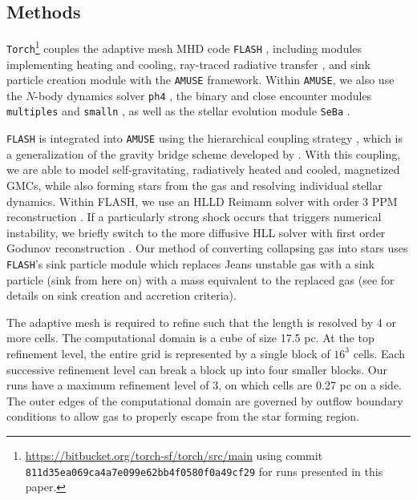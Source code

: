\documentclass[twoside]{drexel-thesis}
\begin{document}
\begin{thesis}
\section{Methods} \label{sec:p1-methods}

\texttt{Torch}\footnote{\url{https://bitbucket.org/torch-sf/torch/src/main} using commit \texttt{ 811d35ea069ca4a7e099e62bb4f0580f0a49cf29} for runs presented in this paper.} \citep{wall_collisional_2019} couples the adaptive mesh MHD code \texttt{FLASH} \citep{fryxell_flash_2000}, including modules implementing heating and cooling, ray-traced radiative transfer \citep{baczynski_fervent_2015}, and sink particle creation module \citep{federrath_modeling_2010} with the \texttt{AMUSE} framework. 
Within \texttt{AMUSE}, we also use the $N$-body dynamics solver \texttt{ph4} \citep{mcmillan_simulations_2012}, the binary and close encounter modules \texttt{multiples} \citep{portegies_zwart_astrophysical_2018} and \texttt{smalln} \citep{hut_building_1995,mcmillan_binary--single-star_1996}, as well as the stellar evolution module \texttt{SeBa} \citep{portegies_zwart_population_1996}.

\texttt{FLASH} is integrated into \texttt{AMUSE} using the hierarchical coupling strategy \citep{portegies_zwart_non-intrusive_2020}, which is a generalization of the gravity bridge scheme developed by \citet{fujii_bridge_2007}.
With this coupling, we are able to model self-gravitating, radiatively heated and cooled, magnetized GMCs, while also forming stars from the gas and resolving individual stellar dynamics. Within FLASH, we use an HLLD Reimann solver \citep{miyoshi_multi-state_2005} with order 3 PPM reconstruction \citep{colella_piecewise_1984}. If a particularly strong shock occurs that triggers numerical instability, we briefly switch to the more diffusive HLL solver \citep{einfeldt_godunov-type_1991} with first order Godunov reconstruction \citep{godunov_finite_1959}.
Our method of converting collapsing gas into stars uses \texttt{FLASH}'s sink particle module \citep{federrath_modeling_2010} which replaces Jeans unstable gas \citep{truelove_jeans_1997} with a sink particle (sink from here on) with a mass equivalent to the replaced gas (see \citealt{federrath_modeling_2010} for details on sink creation and accretion criteria). 

The adaptive mesh is required to refine such that the \citet{truelove_jeans_1997} length is resolved by 4 or more cells. 
The computational domain is a cube of size 17.5 pc. At the top refinement level, the entire grid is represented by a single block of $16^3$ cells. Each successive refinement level can break a block up into four smaller blocks. Our runs have a maximum refinement level of 3, on which cells are 0.27 pc on a side. The outer edges of the computational domain are governed by outflow boundary conditions to allow gas to properly escape from the star forming region.


\end{thesis}
\end{document}
